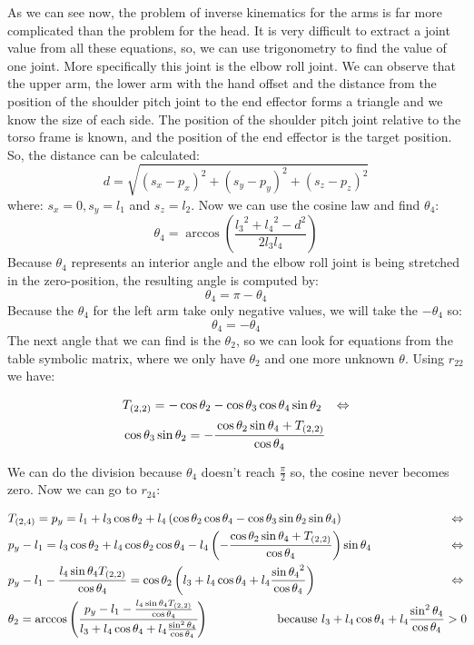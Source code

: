 As we can see now, the problem of inverse kinematics for the arms is far more complicated than the problem for the head. It is very difficult to extract a joint value from all these equations, so, we can use trigonometry to find the value of one joint. More specifically this joint is the elbow roll joint. We can observe that the upper arm, the lower arm with the hand offset and the distance from the position of the shoulder pitch joint to the end effector forms a triangle and we know the size of each side. The position of the shoulder pitch joint relative to the torso frame is known, and the position of the end effector is the target position. So, the distance can be calculated:
\[
d=\sqrt{\left(s_x-p_x\right)^2 + \left(s_y-p_y\right)^2 + \left(s_z-p_z\right)^2}
\]
where: $s_x = 0, s_y = l_1$ and $s_z = l_2$.
Now we can use the cosine law and find $\theta_4$:
\[
\theta_4 = \arccos\left(\frac{{l_3}^2 + {l_4}^2 - d^2}{2l_3l_4}\right)
\]
Because $\theta_4$ represents an interior angle and the elbow roll joint is being stretched in the zero-position, the resulting angle is computed by:
\[
\theta_4 = \pi - \theta_4
\]
Because the $\theta_4$ for the left arm take only negative values, we will take the $-\theta_4$ so:
\[
\theta_4 = - \theta_4
\]
The next angle that we can find is the $\theta_2$, so we can look for equations from the table symbolic matrix, where we only have $\theta_2$ and one more unknown $\theta$. Using $r_{22}$ we have:
\begin{small}
\begin{align*}
&T_{(2,2)} = -\cos\theta_2 - \cos\theta_3\cos\theta_4\sin\theta_2 &\Leftrightarrow\\
&\cos\theta_3\sin\theta_2 = -\cfrac{\cos\theta_2\sin\theta_4 + T_{(2,2)}}{\cos\theta_4}
\end{align*}
\end{small}
We can do the division because $\theta_4$ doesn't reach $\frac{\pi}{2} $ so, the cosine never becomes zero. Now we can go to $r_{24}$:
\begin{small}
\begin{align*}
&T_{(2,4)} = p_y = l_1 + l_3\cos\theta_2 + l_4\left(\cos\theta_2\cos\theta_4 - \cos\theta_3\sin\theta_2\sin\theta_4\right)&\Leftrightarrow\\
&p_y - l_1 =l_3\cos\theta_2 + l_4\cos\theta_2\cos\theta_4 - l_4\left(-\frac{\cos\theta_2\sin\theta_4 + T_{(2,2)}}{\cos\theta_4}\right)\sin\theta_4&\Leftrightarrow\\
&p_y - l_1 - \frac{l_4\sin\theta_4 T_{(2,2)}}{\cos\theta_4} = \cos\theta_2\left(l_3 + l_4\cos\theta_4 + l_4\frac{{\sin\theta_4}^2}{\cos\theta_4}\right)&\Leftrightarrow\\
&\theta_2 = \arccos\left(\cfrac{p_y - l_1 - \frac{l_4\sin\theta_4 T_{(2,2)}}{\cos\theta_4}}{l_3 + l_4\cos\theta_4 + l_4\frac{\sin^2\theta_4}{\cos\theta_4}}\right) \hspace{2cm} \text{because }   l_3 + l_4\cos\theta_4 + l_4\frac{\sin^2\theta_4}{\cos\theta_4}>0 \hspace{-0.8cm}
\end{align*}
\end{small}
